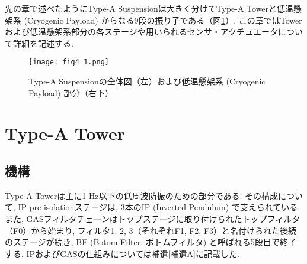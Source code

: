 先の章で述べたようにType-A Suspensionは大きく分けてType-A Towerと低温懸架系 (Cryogenic Payload) からなる9段の振り子である（図\ref{fig4.1}）. この章ではTowerおよび低温懸架系部分の各ステージや用いられるセンサ・アクチュエータについて詳細を記述する. 
\begin{figure}[H]
\begin{center}
\texttt{[image: fig4\_1.png]}
\caption[Type-A Suspensionの全体図および低温懸架系部分]{Type-A Suspensionの全体図（左）および低温懸架系 (Cryogenic Payload) 部分（右下）}
\label{fig4.1}
\end{center}
\end{figure}

\section{Type-A Tower}
\subsection{機構}
Type-A Towerは主に1 Hz以下の低周波防振のための部分である. その構成について, IP pre-isolationステージは, 3本のIP (Inverted Pendulum) で支えられている. また, GASフィルタチェーンはトップステージに取り付けられたトップフィルタ（F0）から始まり, フィルタ1, 2, 3（それぞれF1, F2, F3）と名付けられた後続のステージが続き, BF (Botom Filter: ボトムフィルタ) と呼ばれる5段目で終了する. IPおよびGASの仕組みについては補遺\ref{補遺A}に記載した. 
